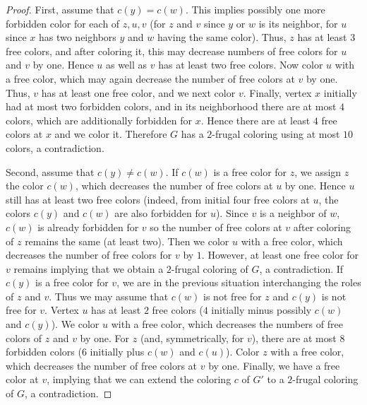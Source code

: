 \documentclass[11pt]{article}
\begin{document}
\begin{proof}
First, assume that $c(y)=c(w)$. This implies possibly one more forbidden color for each of $z,u,v$ (for $z$ and $v$ since $y$ or $w$ is its neighbor, for $u$ since $x$ has two neighbors $y$ and $w$ having the same color). Thus, $z$ has at least $3$ free colors, and after coloring it, this may decrease numbers of free colors for $u$ and $v$ by one. Hence $u$ as well as $v$ has at least two free colors. Now color $u$ with a free color, which may again decrease the number of free colors at $v$ by one. Thus, $v$ has at least one free color, and we next color $v$. Finally, vertex $x$ initially had at most two forbidden colors, and in its neighborhood there are at most $4$ colors, which are additionally forbidden for $x$. Hence there are at least $4$ free colors at $x$ and we color it. Therefore $G$ has a $2$-frugal coloring using at most $10$ colors, a contradiction.

Second, assume that $c(y)\not=c(w)$. If $c(w)$ is a free color for $z$, we assign $z$ the color $c(w)$, which decreases the number of free colors at $u$ by one. Hence $u$ still has at least two free colors (indeed, from initial four free colors at $u$, the colors $c(y)$ and $c(w)$ are also forbidden for $u$). Since $v$ is a neighbor of $w$, $c(w)$ is already forbidden for $v$ so the number of free colors at $v$ after coloring of $z$ remains the same (at least two). Then we color $u$ with a free color, which decreases the number of free colors for $v$ by $1$. However, at least one free color for $v$ remains implying that we obtain a $2$-frugal coloring of $G$, a contradiction. If $c(y)$ is a free color for $v$, we are in the previous situation interchanging the roles of $z$ and $v$. Thus we may assume that $c(w)$ is not free for $z$ and $c(y)$ is not free for $v$. Vertex $u$ has at least $2$ free colors ($4$ initially minus possibly $c(w)$ and $c(y)$). We color $u$ with a free color, which decreases the numbers of free colors of $z$ and $v$ by one. For $z$ (and, symmetrically, for $v$), there are at most $8$ forbidden colors (6 initially plus $c(w)$ and $c(u)$). Color $z$ with a free color, which decreases the number of free colors at $v$ by one. Finally, we have a free color at $v$, implying that we can extend the coloring $c$ of $G'$ to a $2$-frugal coloring of $G$, a contradiction.
\end{proof}
\end{document}
